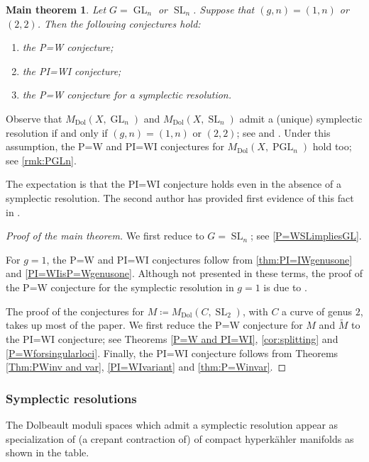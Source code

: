 \documentclass[11pt]{article}
\newtheorem*{mainthm}{Main theorem}
\theoremstyle{definition}
\newcommand{\Gl}{\operatorname{GL}}
\newcommand{\Sl}{\operatorname{SL}}
\newcommand{\PGl}{\operatorname{PGL}}
\newcommand{\MDolGl}{{M}_{\mathrm{Dol}}(X, \Gl_n)}
\newcommand{\MDolSl}{{M}_{\mathrm{Dol}}(X, \Sl_n)}
\newcommand{\MDolPGl}{{M}_{\mathrm{Dol}}(X, \PGl_n)}
\begin{document}
\begin{mainthm}
Let $G=\Gl_n$ or $\Sl_n$. Suppose that $(g,n)=(1,n)$ or $(2,2)$. Then the following conjectures hold:
\begin{enumerate}
\item the P=W conjecture;
\item the PI=WI conjecture;
\item the P=W conjecture for a symplectic resolution.
\end{enumerate}
\end{mainthm}
Observe that $\MDolGl$ and $\MDolSl$ admit a (unique) symplectic resolution if and only if $(g,n)=(1,n)$ or $(2,2)$; see \cite{BellamySchedler2019} and \cite[Th.\,2.2]{FuNamikawa04}. Under this assumption, the P=W and PI=WI conjectures for $\MDolPGl$ hold too; see \hbox{\cref{rmk:PGLn}}.

The expectation is that the PI=WI conjecture holds even in the absence of a symplectic resolution. The second author has provided first evidence of this fact in \cite[\S 5]{Mauri2021}.
\begin{proof}[Proof of the main theorem]
We first reduce to $G=\Sl_n$; see \cref{P=WSLimpliesGL}.

For $g=1$, the P=W and PI=WI conjectures follow from \cref{thm:PI=IWgenusone} and
\hbox{\cref{PI=WIisP=Wgenusone}}.
Although not presented in these terms, the proof of the P=W conjecture for the symplectic resolution in $g=1$ is due to \cite{deCataldoHauselMigliorini2013}.

The proof of the conjectures for $M \coloneqq M_{\mathrm{Dol}}(C, \Sl_2)$, with $C$ a curve of genus $2$, takes up most of the paper. We first reduce the P=W conjecture for $M$ and $\widetilde{M}$ to the PI=WI conjecture; see Theorems \ref{P=W and PI=WI}, \ref{cor:splitting} and \ref{P=Wforsingularloci}. Finally, the PI=WI conjecture follows from Theorems \ref{Thm:PWinv and var}, \ref{PI=WIvariant} and \ref{thm:P=Winvar}.
\end{proof}

\subsubsection*{Symplectic resolutions}
The Dolbeault moduli spaces which admit a symplectic resolution appear as specialization of (a crepant contraction of) of compact hyperkähler manifolds as shown in the table.
\end{document}
